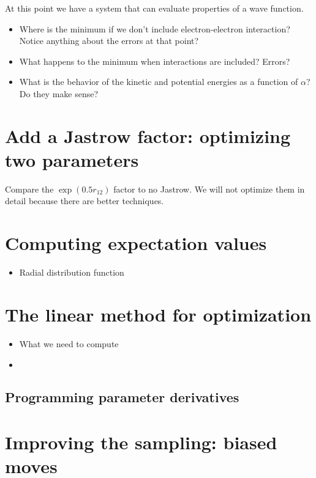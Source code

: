 \documentclass[12pt]{article}
\begin{document}
At this point we have a system that can evaluate properties of a wave function. 

\begin{itemize}
\item Where is the minimum if we don't include electron-electron interaction? Notice anything about the errors at that point?
\item What happens to the minimum when interactions are included? Errors?
\item What is the behavior of the kinetic and potential energies as a function of $\alpha$? Do they make sense?	
\end{itemize}


\section{Add a Jastrow factor: optimizing two parameters} 

Compare the $\exp(0.5r_{12})$ factor to no Jastrow. We will not optimize them in detail because there are better techniques.

\section{Computing expectation values}

\begin{itemize}
\item Radial distribution function	
\end{itemize}

\section{The linear method for optimization} 

\begin{itemize}
\item What we need to compute
\item 
\end{itemize}

\subsection{Programming parameter derivatives}


\section{Improving the sampling: biased moves} 
\end{document}
